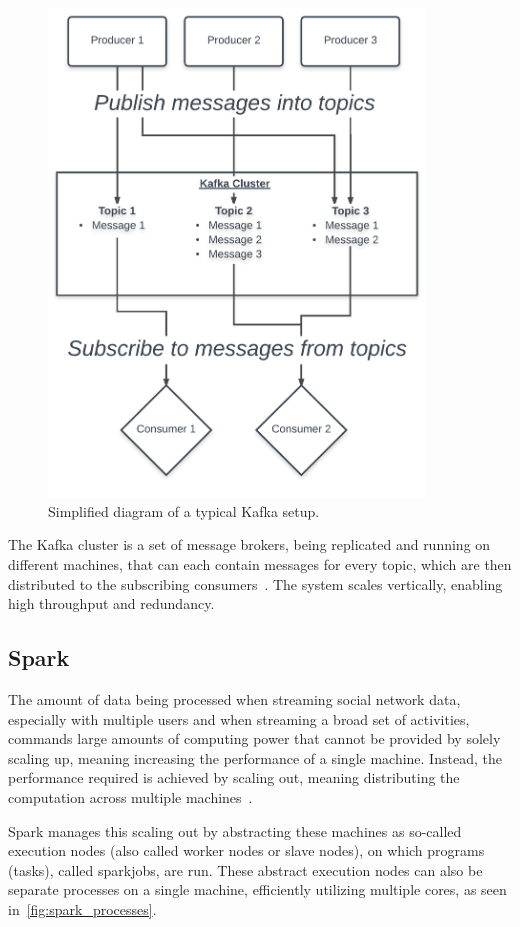 \begin{figure}
    \centering
    \caption{Simplified diagram of a typical Kafka setup.}
    \label{fig:kafka}
    \includegraphics[width=10cm]{../figures/kafka.pdf}
\end{figure}

The Kafka cluster is a set of message brokers, being replicated and running on different machines, that can each contain messages for every topic,
which are then distributed to the subscribing consumers~\cite{Kreps2015}.
The system scales vertically, enabling high throughput and redundancy.

\subsection{Spark}
\label{subsec:spark}

The amount of data being processed when streaming social network data,
especially with multiple users and when streaming a broad set of activities,
commands large amounts of computing power that cannot be provided by solely scaling up,
meaning increasing the performance of a single machine.
Instead, the performance required is achieved by scaling out,
meaning distributing the computation across multiple machines~\cite{Wolke2010}.

\par %
Spark manages this scaling out by abstracting these machines as so-called execution nodes (also called worker nodes or slave nodes),
on which programs (tasks), called sparkjobs, are run.
These abstract execution nodes can also be separate processes on a single machine,
efficiently utilizing multiple cores, as seen in~\ref{fig:spark_processes}.

